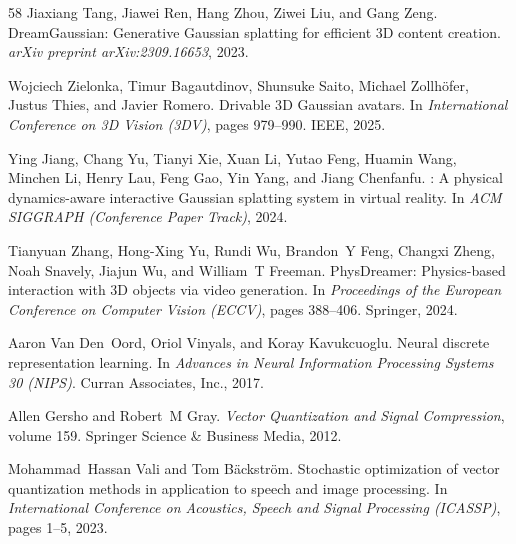 \documentclass{article}
\begin{document}
\begin{thebibliography}{58}
Jiaxiang Tang, Jiawei Ren, Hang Zhou, Ziwei Liu, and Gang Zeng.
\newblock Dream{G}aussian: Generative {G}aussian splatting for efficient 3{D}
  content creation.
\newblock \emph{arXiv preprint arXiv:2309.16653}, 2023.

Wojciech Zielonka, Timur Bagautdinov, Shunsuke Saito, Michael Zollh{\"o}fer,
  Justus Thies, and Javier Romero.
\newblock Drivable 3{D} {G}aussian avatars.
\newblock In \emph{International Conference on 3D Vision (3DV)}, pages
  979--990. IEEE, 2025.

Ying Jiang, Chang Yu, Tianyi Xie, Xuan Li, Yutao Feng, Huamin Wang, Minchen Li,
  Henry Lau, Feng Gao, Yin Yang, and Jiang Chenfanfu.
: A physical dynamics-aware interactive {G}aussian splatting
  system in virtual reality.
\newblock In \emph{ACM SIGGRAPH (Conference Paper Track)}, 2024.

Tianyuan Zhang, Hong-Xing Yu, Rundi Wu, Brandon~Y Feng, Changxi Zheng, Noah
  Snavely, Jiajun Wu, and William~T Freeman.
\newblock Phys{D}reamer: Physics-based interaction with {3D} objects via video
  generation.
\newblock In \emph{Proceedings of the European Conference on Computer Vision
  (ECCV)}, pages 388--406. Springer, 2024.

Aaron Van Den~Oord, Oriol Vinyals, and Koray Kavukcuoglu.
\newblock Neural discrete representation learning.
\newblock In \emph{Advances in Neural Information Processing Systems 30
  (NIPS)}. Curran Associates, Inc., 2017.

Allen Gersho and Robert~M Gray.
\newblock \emph{Vector Quantization and Signal Compression}, volume 159.
\newblock Springer Science \& Business Media, 2012.

Mohammad~Hassan Vali and Tom B{\"a}ckstr{\"o}m.
\newblock Stochastic optimization of vector quantization methods in application
  to speech and image processing.
\newblock In \emph{International Conference on Acoustics, Speech and Signal
  Processing (ICASSP)}, pages 1--5, 2023.


\end{thebibliography}
\end{document}
